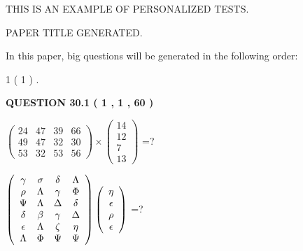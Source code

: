 \documentclass[12pt]{article}
\begin{document}
   
   
   
   
   
   
   
 \vspace{0.2in}
{\Huge  THIS IS AN EXAMPLE OF}
{\Huge  PERSONALIZED TESTS. }
   
   
 PAPER TITLE GENERATED.
   
   
   
\vspace{0.2in}
   
In this paper, big questions will be generated in the following order: 
   
   
             1 (           1 )
 .
  
\vspace{0.2in}
  
{\textbf{\Large{QUESTION
30.1 
 (           1 ,           1 ,          60 )
}}}
  
  
 
$ \left( \begin{array}{ccccccccc}
          24  & 
          47  & 
          39  & 
          66  \\ 
          49  & 
          47  & 
          32  & 
          30  \\ 
          53  & 
          32  & 
          53  & 
          56
\end{array}\right) \times
\left( \begin{array}{c}
          14  \\ 
          12  \\ 
           7  \\ 
          13
\end{array}\right) $ =?
 
 
$  %
 \left( \begin{array}
 {
 c
 c
 c
 c
 }
 \gamma & 
 \sigma & 
 \delta & 
 \Lambda \\ 
 \rho & 
 \Lambda & 
 \gamma & 
 \Phi \\ 
 \Psi & 
 \Lambda & 
 \Delta & 
 \delta \\ 
 \delta & 
 \beta & 
 \gamma & 
 \Delta \\ 
 \epsilon & 
 \Lambda & 
                    \zeta & 
 \eta \\ 
 \Lambda & 
 \Phi & 
 \Psi & 
 \Psi
 \end{array} \right)
 \left( \begin{array}
 {
 c
 }
 \eta \\ 
 \epsilon \\ 
 \rho \\ 
 \epsilon
 \end{array} \right)
$ =?
 
\end{document}
